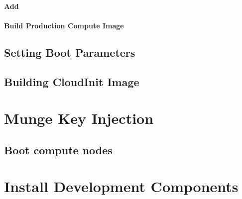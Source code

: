 \documentclass[letterpaper]{article}
\begin{document}
\paragraph{Add \nhc{}} \label{sec:add_nhc}




\paragraph{Build Production Compute Image}


\subsection{Setting Boot Parameters}\label{sec:boot_params_set}


\subsection{Building CloudInit Image}\label{sec:cloudinit}



%
%


\section{Munge Key Injection} \label{sec:cloudinit-munge}


\subsection{Boot compute nodes} \label{sec:boot_computes}


\section{Install \OHPC{} Development Components}

\end{document}
